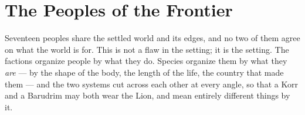 %

\chapter{The Peoples of the Frontier}

Seventeen peoples share the settled world and its edges, and no two of them agree on what the world is for. This is not a flaw in the setting; it is the setting. The factions organize people by what they do. Species organize them by what they \textit{are} --- by the shape of the body, the length of the life, the country that made them --- and the two systems cut across each other at every angle, so that a Korr and a Barudrim may both wear the Lion, and mean entirely different things by it.

